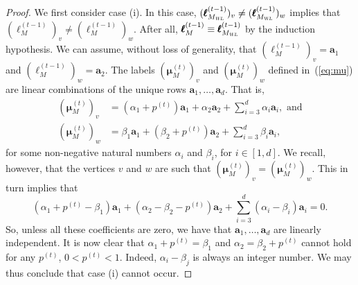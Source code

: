 \begin{proof}
We first consider case (i). In this case, $(\pmb{\ell}_{M_{\textsl{WL}}}^{(t-1)})_v\neq(\pmb{\ell}_{M_{\textsl{WL}}}^{(t-1)})_w$ implies that
	$(\pmb{\ell}^{(t-1)}_M)_{v}\neq (\pmb{\ell}_M^{(t-1)})_w$. After all,
	$\pmb{\ell}^{(t-1)}_M\equiv \pmb{\ell}_{M_{\textsl{WL}}}^{(t-1)}$ by the induction hypothesis. We can assume, without loss of generality,  that $(\pmb{\ell}^{(t-1)}_M)_{v}=\mathbf{a}_1$ and
	$(\pmb{\ell}^{(t-1)}_M)_{w}=\mathbf{a}_2$. The labels $(\pmb{\mu}_M^{(t)})_v$ and 
	$(\pmb{\mu}_M^{(t)})_w$ defined in~(\ref{eq:mu}) are linear combinations of the unique rows
	$\mathbf{a}_1,\ldots,\mathbf{a}_d$. That is,
	\begin{align*}
	(\pmb{\mu}_M^{(t)})_v&=(\alpha_1+p^{(t)})\mathbf{a}_1+ \alpha_2\mathbf{a}_2+ \sum_{i=3}^d \alpha_i\mathbf{a}_i, \text{ and}\\
	(\pmb{\mu}_M^{(t)})_w&=\beta_1\mathbf{a}_1+ (\beta_2+p^{(t)})\mathbf{a}_2+ \sum_{i=3}^d \beta_i\mathbf{a}_i,
	\end{align*}
	for some non-negative natural numbers $\alpha_i$ and $\beta_i$, for $i\in[1,d]$.
We recall, however, that the vertices $v$ and $w$ are such that
$(\pmb{\mu}_M^{(t)})_{v}=(\pmb{\mu}_M^{(t)})_{w}$. This in turn implies that
	$$
	(\alpha_1+p^{(t)}-\beta_1)\mathbf{a}_1 + (\alpha_2-\beta_2-p^{(t)})\mathbf{a}_2 +\sum_{i=3}^d (\alpha_i-\beta_i)\mathbf{a}_i=0.
	$$
	So, unless all these coefficients are zero, we have that $\mathbf{a}_1,\ldots,\mathbf{a}_d$
	are linearly independent. It is now clear that $\alpha_1+p^{(t)}=\beta_1$ and
	$\alpha_2=\beta_2+p^{(t)}$ cannot hold for any $p^{(t)}$, $0<p^{(t)}<1$. Indeed, $\alpha_i-\beta_j$
	is always an integer number. We may thus conclude that case (i) cannot occur.
	


\end{proof}
